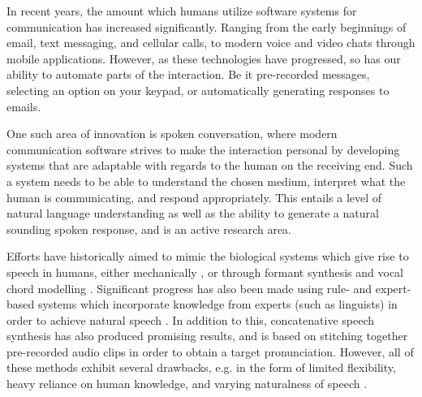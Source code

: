 \documentclass{report}
\begin{document}

In recent years, the amount which humans utilize software systems for communication has increased significantly. Ranging from the early beginnings of email, text messaging, and cellular calls, to modern voice and video chats through mobile applications. However, as these technologies have progressed, so has our ability to automate parts of the interaction. Be it pre-recorded messages, selecting an option on your keypad, or automatically generating responses to emails.

One such area of innovation is spoken conversation, where modern communication software strives to make the interaction personal by developing systems that are adaptable with regards to the human on the receiving end. Such a system needs to be able to understand the chosen medium, interpret what the human is communicating, and respond appropriately. This entails a level of natural language understanding as well as the ability to generate a natural sounding spoken response, and is an active research area.

Efforts have historically aimed to mimic the biological systems which give rise to speech in humans, either mechanically \cite{von1791mechanismus}, or through formant synthesis and vocal chord modelling \cite{fant1970acoustic}. Significant progress has also been made using rule- and expert-based systems which incorporate knowledge from experts (such as linguists) in order to achieve natural speech \cite{klatt1980software}. In addition to this, concatenative speech synthesis has also produced promising results, and is based on stitching together pre-recorded audio clips in order to obtain a target pronunciation. However, all of these methods exhibit several drawbacks, e.g. in the form of limited flexibility, heavy reliance on human knowledge, and varying naturalness of speech \cite{tan2021survey}.

\end{document}
